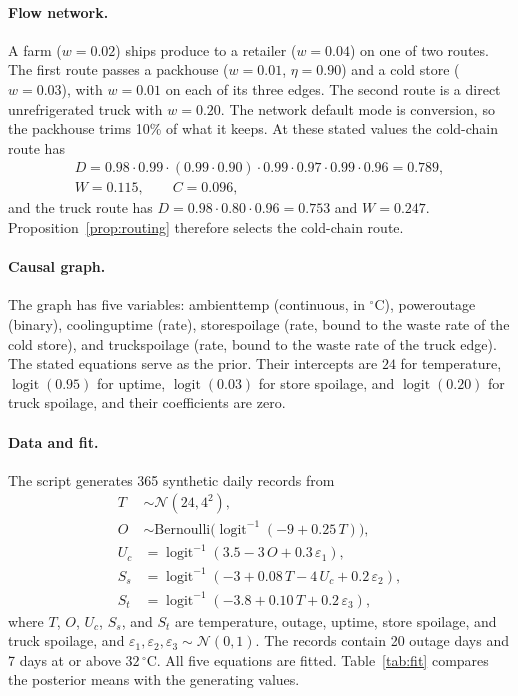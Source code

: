 \documentclass[12pt]{article}
\DeclareMathOperator{\logit}{logit}
\newcommand{\expit}{\logit^{-1}}
\newcommand{\code}[1]{{\ttfamily\def\_{\textunderscore\allowbreak}#1}}
\theoremstyle{plain}
\theoremstyle{definition}
\begin{document}
\paragraph{Flow network.}
A farm ($w=0.02$) ships produce to a retailer ($w=0.04$) on one of two routes. The first route passes a packhouse ($w=0.01$, $\eta=0.90$) and a cold store ($w=0.03$), with $w=0.01$ on each of its three edges. The second route is a direct unrefrigerated truck with $w=0.20$. The network default mode is conversion, so the packhouse trims 10\% of what it keeps. At these stated values the cold-chain route has
\begin{gather*}
    D=0.98\cdot0.99\cdot(0.99\cdot0.90)\cdot0.99\cdot0.97\cdot0.99\cdot0.96=0.789,\\
    W=0.115,\qquad C=0.096,
\end{gather*}
and the truck route has $D=0.98\cdot0.80\cdot0.96=0.753$ and $W=0.247$. Proposition~\ref{prop:routing} therefore selects the cold-chain route.

\paragraph{Causal graph.}
The graph has five variables: \code{ambient\_temp} (continuous, in $^\circ$C), \code{power\_outage} (binary), \code{cooling\_uptime} (rate), \code{store\_spoilage} (rate, bound to the waste rate of the cold store), and \code{truck\_spoilage} (rate, bound to the waste rate of the truck edge). The stated equations serve as the prior. Their intercepts are $24$ for temperature, $\logit(0.95)$ for uptime, $\logit(0.03)$ for store spoilage, and $\logit(0.20)$ for truck spoilage, and their coefficients are zero.

\paragraph{Data and fit.}
The script generates 365 synthetic daily records from
\begin{align*}
    T&\sim\mathcal{N}(24,4^2),\\
    O&\sim\text{Bernoulli}\bigl(\expit(-9+0.25\,T)\bigr),\\
    U_c&=\expit(3.5-3\,O+0.3\,\varepsilon_1),\\
    S_s&=\expit(-3+0.08\,T-4\,U_c+0.2\,\varepsilon_2),\\
    S_t&=\expit(-3.8+0.10\,T+0.2\,\varepsilon_3),
\end{align*}
where $T$, $O$, $U_c$, $S_s$, and $S_t$ are temperature, outage, uptime, store spoilage, and truck spoilage, and $\varepsilon_1,\varepsilon_2,\varepsilon_3\sim\mathcal{N}(0,1)$. The records contain 20 outage days and 7 days at or above $32\,^\circ$C. All five equations are fitted. Table~\ref{tab:fit} compares the posterior means with the generating values.
\end{document}
